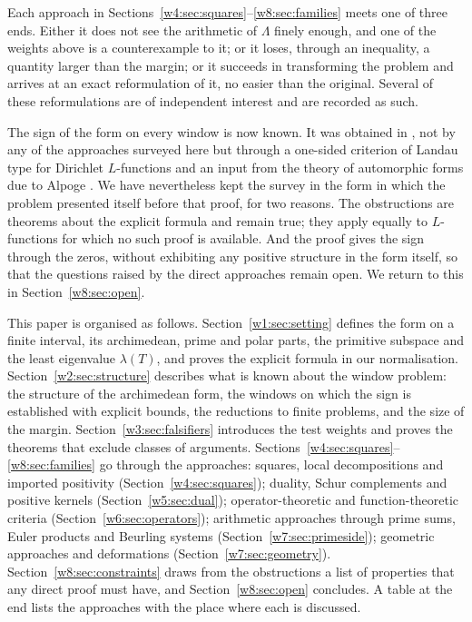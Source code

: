 \documentclass[11pt]{amsart}
\theoremstyle{definition}
\theoremstyle{remark}
\numberwithin{equation}{section}
\newcommand{\lam}{\lambda(T)}                          %
\begin{document}
Each approach in Sections~\ref{w4:sec:squares}--\ref{w8:sec:families} meets one of three ends. Either it does
not see the arithmetic of $\Lambda$ finely enough, and one of the weights above is a counterexample to it; or it
loses, through an inequality, a quantity larger than the margin; or it succeeds in transforming the problem and
arrives at an exact reformulation of it, no easier than the original. Several of these reformulations are of
independent interest and are recorded as such.

The sign of the form on every window is now known. It was obtained in \cite{P46}, not by any of the approaches
surveyed here but through a one-sided criterion of Landau type for Dirichlet $L$-functions and an input from
the theory of automorphic forms due to Alpoge \cite{CharacterFamily}. We have nevertheless kept the survey in
the form in which the problem presented itself before that proof, for two reasons. The obstructions are
theorems about the explicit formula and remain true; they apply equally to $L$-functions for which no such
proof is available. And the proof gives the sign through the zeros, without exhibiting any positive structure
in the form itself, so that the questions raised by the direct approaches remain open. We return to this in
Section~\ref{w8:sec:open}.

This paper is organised as follows. Section~\ref{w1:sec:setting} defines the form on a finite interval, its
archimedean, prime and polar parts, the primitive subspace and the least eigenvalue $\lam$, and proves the
explicit formula in our normalisation. Section~\ref{w2:sec:structure} describes what is known about the window
problem: the structure of the archimedean form, the windows on which the sign is established with explicit
bounds, the reductions to finite problems, and the size of the margin. Section~\ref{w3:sec:falsifiers} introduces
the test weights and proves the theorems that exclude classes of arguments.
Sections~\ref{w4:sec:squares}--\ref{w8:sec:families} go through the approaches: squares, local decompositions
and imported positivity (Section~\ref{w4:sec:squares}); duality, Schur complements and positive kernels
(Section~\ref{w5:sec:dual}); operator-theoretic and function-theoretic criteria (Section~\ref{w6:sec:operators});
arithmetic approaches through prime sums, Euler products and Beurling systems (Section~\ref{w7:sec:primeside});
geometric approaches and deformations (Section~\ref{w7:sec:geometry}). Section~\ref{w8:sec:constraints} draws
from the obstructions a list of properties that any direct proof must have, and Section~\ref{w8:sec:open}
concludes. A table at the end lists the approaches with the place where each is discussed.
\end{document}

